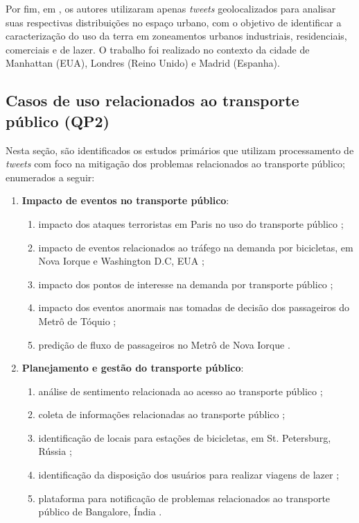 \documentclass[
	12pt,				%
	oneside,			%
	a4paper,			%
	english,			%
	brazil				%
	]{abntex2ppgsi}
\begin{document}
{{Por fim, em \cite{Frias-Martinez2014}, os autores utilizaram apenas \textit{tweets} geolocalizados para analisar suas respectivas distribuições no espaço urbano, com o objetivo de identificar a caracterização do uso da terra em zoneamentos urbanos industriais, residenciais, comerciais e de lazer. O trabalho foi realizado no contexto da cidade de Manhattan (EUA), Londres (Reino Unido) e Madrid (Espanha).

\subsection{Casos de uso relacionados ao transporte público (QP2)}
Nesta seção, são identificados os estudos primários que utilizam processamento de \textit{tweets} com foco na mitigação dos problemas relacionados ao transporte público; enumerados a seguir:
\begin{enumerate}
\item \textbf{Impacto de eventos no transporte público}:
\begin{enumerate}
\item impacto dos ataques terroristas em Paris no uso do transporte público \cite{Wen2016};
\item impacto de eventos relacionados ao tráfego na demanda por bicicletas, em Nova Iorque e Washington D.C, EUA \cite{Chen2016};
\item impacto dos pontos de interesse na demanda por transporte público \cite{Maghrebi2015};
\item impacto dos eventos anormais nas tomadas de decisão dos passageiros do Metrô de Tóquio \cite{Itoh2016};
\item predição de fluxo de passageiros no Metrô de Nova Iorque \cite{Ni2016}.
\end{enumerate}

\item \textbf{Planejamento e gestão do transporte público}:
\begin{enumerate}
\item análise de sentimento relacionada ao acesso ao transporte público \cite{Guo2016};
\item coleta de informações relacionadas ao transporte público \cite{Gal-Tzur2014};
\item identificação de locais para estações de bicicletas, em St. Petersburg, Rússia \cite{Gutev2016};
\item identificação da disposição dos usuários para realizar viagens de lazer \cite{Gkiotsalitis2016};
\item plataforma para notificação de problemas relacionados ao transporte público de Bangalore, Índia \cite{Mukherjee2015}.
\end{enumerate} 
\end{enumerate}

}}
\end{document}
